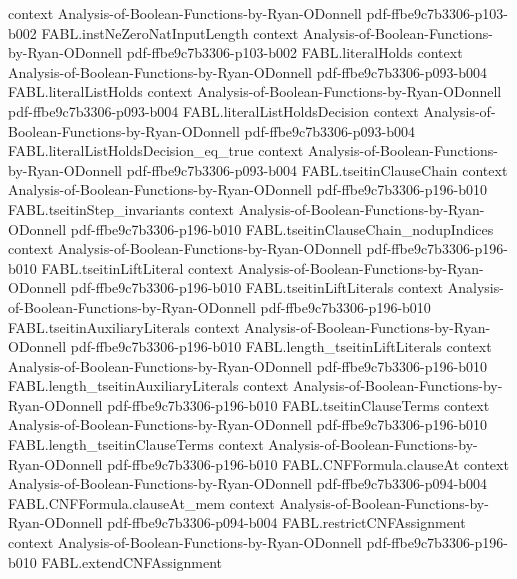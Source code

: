 \begin{theorem}
  {context}
  {Analysis-of-Boolean-Functions-by-Ryan-ODonnell}
  {pdf-ffbe9c7b3306-p103-b002}
\proofstep
  {FABL.instNeZeroNatInputLength}
  {context}
  {Analysis-of-Boolean-Functions-by-Ryan-ODonnell}
  {pdf-ffbe9c7b3306-p103-b002}
\proofstep
  {FABL.literalHolds}
  {context}
  {Analysis-of-Boolean-Functions-by-Ryan-ODonnell}
  {pdf-ffbe9c7b3306-p093-b004}
\proofstep
  {FABL.literalListHolds}
  {context}
  {Analysis-of-Boolean-Functions-by-Ryan-ODonnell}
  {pdf-ffbe9c7b3306-p093-b004}
\proofstep
  {FABL.literalListHoldsDecision}
  {context}
  {Analysis-of-Boolean-Functions-by-Ryan-ODonnell}
  {pdf-ffbe9c7b3306-p093-b004}
\proofstep
  {FABL.literalListHoldsDecision_eq_true}
  {context}
  {Analysis-of-Boolean-Functions-by-Ryan-ODonnell}
  {pdf-ffbe9c7b3306-p093-b004}
\proofstep
  {FABL.tseitinClauseChain}
  {context}
  {Analysis-of-Boolean-Functions-by-Ryan-ODonnell}
  {pdf-ffbe9c7b3306-p196-b010}
\proofstep
  {FABL.tseitinStep_invariants}
  {context}
  {Analysis-of-Boolean-Functions-by-Ryan-ODonnell}
  {pdf-ffbe9c7b3306-p196-b010}
\proofstep
  {FABL.tseitinClauseChain_nodupIndices}
  {context}
  {Analysis-of-Boolean-Functions-by-Ryan-ODonnell}
  {pdf-ffbe9c7b3306-p196-b010}
\proofstep
  {FABL.tseitinLiftLiteral}
  {context}
  {Analysis-of-Boolean-Functions-by-Ryan-ODonnell}
  {pdf-ffbe9c7b3306-p196-b010}
\proofstep
  {FABL.tseitinLiftLiterals}
  {context}
  {Analysis-of-Boolean-Functions-by-Ryan-ODonnell}
  {pdf-ffbe9c7b3306-p196-b010}
\proofstep
  {FABL.tseitinAuxiliaryLiterals}
  {context}
  {Analysis-of-Boolean-Functions-by-Ryan-ODonnell}
  {pdf-ffbe9c7b3306-p196-b010}
\proofstep
  {FABL.length_tseitinLiftLiterals}
  {context}
  {Analysis-of-Boolean-Functions-by-Ryan-ODonnell}
  {pdf-ffbe9c7b3306-p196-b010}
\proofstep
  {FABL.length_tseitinAuxiliaryLiterals}
  {context}
  {Analysis-of-Boolean-Functions-by-Ryan-ODonnell}
  {pdf-ffbe9c7b3306-p196-b010}
\proofstep
  {FABL.tseitinClauseTerms}
  {context}
  {Analysis-of-Boolean-Functions-by-Ryan-ODonnell}
  {pdf-ffbe9c7b3306-p196-b010}
\proofstep
  {FABL.length_tseitinClauseTerms}
  {context}
  {Analysis-of-Boolean-Functions-by-Ryan-ODonnell}
  {pdf-ffbe9c7b3306-p196-b010}
\proofstep
  {FABL.CNFFormula.clauseAt}
  {context}
  {Analysis-of-Boolean-Functions-by-Ryan-ODonnell}
  {pdf-ffbe9c7b3306-p094-b004}
\proofstep
  {FABL.CNFFormula.clauseAt_mem}
  {context}
  {Analysis-of-Boolean-Functions-by-Ryan-ODonnell}
  {pdf-ffbe9c7b3306-p094-b004}
\proofstep
  {FABL.restrictCNFAssignment}
  {context}
  {Analysis-of-Boolean-Functions-by-Ryan-ODonnell}
  {pdf-ffbe9c7b3306-p196-b010}
\proofstep
  {FABL.extendCNFAssignment}

\end{theorem}
